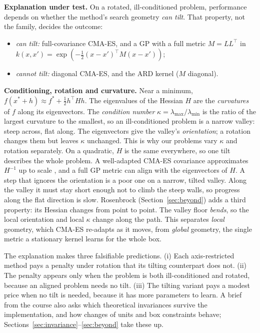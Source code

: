 \documentclass[10pt,a4paper]{article}
\begin{document}
\textbf{Explanation under test.} On a rotated, ill-conditioned problem, performance depends on whether
the method's search geometry \emph{can tilt}. That property, not the family, decides the outcome:
\begin{itemize}
\item \emph{can tilt:} full-covariance CMA-ES, and a GP with a full metric $M=LL^\top$ in
$k(x,x')=\exp(-\tfrac12(x-x')^\top M(x-x'))$;
\item \emph{cannot tilt:} diagonal CMA-ES, and the ARD kernel ($M$ diagonal).
\end{itemize}
\textbf{Conditioning, rotation and curvature.} Near a minimum, $f(x^*+h)\approx f^*+\tfrac12 h^\top Hh$.
The eigenvalues of the Hessian $H$ are the \emph{curvatures} of $f$ along its eigenvectors. The
\emph{condition number} $\kappa=\lambda_{\max}/\lambda_{\min}$ is the ratio of the largest curvature to the
smallest, so an ill-conditioned problem is a narrow valley: steep across, flat along. The eigenvectors
give the valley's \emph{orientation}; a rotation changes them but leaves $\kappa$ unchanged. This is why
our problems vary $\kappa$ and rotation separately. On a quadratic, $H$ is the same everywhere, so one
tilt describes the whole problem. A well-adapted CMA-ES covariance approximates $H^{-1}$ up to scale
\citep{hansen2016tutorial}, and a full GP metric can align with the eigenvectors of $H$. A step that
ignores the orientation is a poor one on a narrow, tilted valley. Along the valley it must stay short
enough not to climb the steep walls, so progress along the flat direction is slow. Rosenbrock
(Section~\ref{sec:beyond}) adds a third property: its Hessian changes from point to point. The valley
floor \emph{bends}, so the local orientation and local $\kappa$ change along the path. This separates
\emph{local} geometry, which CMA-ES re-adapts as it moves, from \emph{global} geometry, the single metric a
stationary kernel learns for the whole box.

The explanation makes three falsifiable predictions. (i) Each axis-restricted method pays a penalty
under rotation that its tilting counterpart does not. (ii) The penalty appears only when the problem is
both ill-conditioned and rotated, because an aligned problem needs no tilt. (iii) The tilting variant
pays a modest price when no tilt is needed, because it has more parameters to learn. A brief
from the course also asks which theoretical invariances survive the implementation, and how changes of units and
box constraints behave; Sections~\ref{sec:invariance}--\ref{sec:beyond} take these up.
\end{document}
